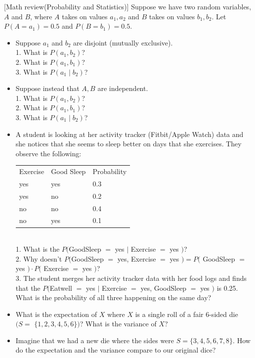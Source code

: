 \item {} [Math review(Probability and Statistics)]
Suppose we have two random variables, $A$ and $B$, where $A$ takes on values $a_1, a_2$ and $B$ takes on values $b_1, b_2$. Let $P\left(A=a_1\right)=0.5$ and $P\left(B=b_1\right)=0.5$.
\begin{itemize}
    \item[(a)] Suppose $a_1$ and $b_2$ are disjoint (mutually exclusive). ~ \\
    1. What is $P\left(a_1, b_2\right)$? \\
    2. What is $P\left(a_1, b_1\right)$? \\
    3. What is $P\left(a_1 \mid b_2\right)$?

    \item[(b)] Suppose instead that $A, B$ are independent. ~ \\
    1. What is $P\left(a_1, b_2\right)$? \\
    2. What is $P\left(a_1, b_1\right)$? \\
    3. What is $P\left(a_1 \mid b_2\right)$?
    \item[(c)] A student is looking at her activity tracker (Fitbit/Apple Watch) data and she notices that she seems to sleep better on days that she exercises. They observe the following: \\
    \begin{tabular}{lll}
    Exercise & Good Sleep & Probability \\
    yes & yes & 0.3 \\
    yes & no & 0.2 \\
    no & no & 0.4 \\
    no & yes & 0.1
    \end{tabular} \\
    1. What is the $P($GoodSleep $=$ yes $|$ Exercise $=$ yes $)$? \\
    2. Why doesn't $P($GoodSleep $=$ yes, Exercise $=$ yes $)=P($ GoodSleep $=$ yes $)\cdot P($ Exercise $=$ yes $)$? \\
    3. The student merges her activity tracker data with her food logs and finds that the $P($Eatwell $=$ yes $|$ Exercise $=$ yes, GoodSleep $=$ yes $)$ is 0.25. What is the probability of all three happening on the same day? ~

    \item[(d)] What is the expectation of $X$ where $X$ is a single roll of a fair 6-sided die $(S=$ $\{1,2,3,4,5,6\})$? What is the variance of $X$? ~

    \item[(e)] Imagine that we had a new die where the sides were $S=\{3,4,5,6,7,8\}$. How do the expectation and the variance compare to our original dice? ~
\end{itemize}

